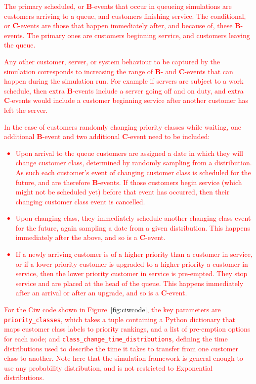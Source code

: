 \documentclass{article}
\begin{document}
\textcolor{red}{The primary scheduled, or \textbf{B}-events that occur in
queueing simulations are customers arriving to a queue, and customers finishing
service.
The conditional, or \textbf{C}-events are those that happen immediately after,
and because of, these \textbf{B}-events. The primary ones are customers
beginning service, and customers leaving the queue.}

\textcolor{red}{Any other customer, server, or system behaviour to be captured
by the simulation corresponds to increasing the range of \textbf{B}- and
\textbf{C}-events that can happen during the simulation run.
For example if servers are subject to a work schedule, then extra
\textbf{B}-events include a server going off and on duty, and extra
\textbf{C}-events would include a customer beginning service after another
customer has left the server.}

\textcolor{red}{In the case of customers randomly changing priority classes
while waiting, one additional \textbf{B}-event and two additional
\textbf{C}-event need to be included:}

\textcolor{red}{%
\begin{itemize}
  \item Upon arrival to the queue customers are assigned a date in which they
  will change customer class, determined by randomly sampling from a
  distribution. As such each customer's event of changing customer class is
  scheduled for the future, and are therefore \textbf{B}-events. If those
  customers begin service (which might not be scheduled yet) before that event
  has occurred, then their changing customer class event is cancelled.
  \item Upon changing class, they immediately schedule another changing class
  event for the future, again sampling a date from a given distribution. This
  happens immediately after the above, and so is a \textbf{C}-event.
  \item If a newly arriving customer is of a higher priority than a customer in
  service, or if a lower priority customer is upgraded to a higher priority a
  customer in service, then the lower priority customer in service is
  pre-empted. They stop service and are placed at the head of the queue. This
  happens immediately after an arrival or after an upgrade, and so is a
  \textbf{C}-event.
\end{itemize}%
}


\textcolor{red}{For the Ciw code shown in Figure~\ref{fig:ciwcode}, the key
parameters are \texttt{priority_classes}, which takes a tuple
containing a Python dictionary that maps customer class labels to priority
rankings, and a list of pre-emption options for each node; and
\texttt{class_change_time_distributions}, defining the time
distributions used to describe the time it takes to transfer from one
customer class to another.
Note here that the simulation framework is general enough to use any
probability distribution, and is not restricted to Exponential distributions.}
\end{document}
